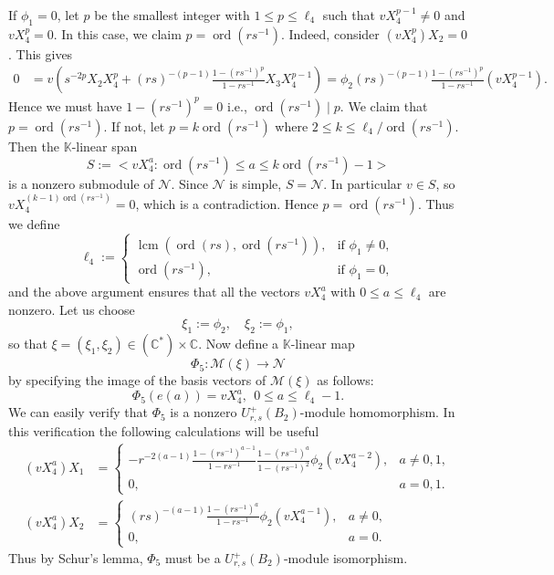 \documentclass[12 pt,reqno]{amsart}
\numberwithin{equation}{section}
\DeclareMathOperator{\ord}{ord}
\theoremstyle{definition}
\theoremstyle{definition}
\theoremstyle{remark}
\theoremstyle{remark}
\begin{document}
\noindent If $\phi_1 = 0$, let $p$ be the smallest integer with $1 \leq p \leq \ell_4$ such that $vX_4^{p-1}\neq 0$ and $vX_4^p=0$. In this case, we claim $p=\ord(rs^{-1})$. Indeed, consider $\left(vX_4^p\right)X_2=0$. This gives 
\begin{align*}
   0&=v \left(s^{-2p}X_2X_4^p+(rs)^{-(p-1)}\displaystyle\frac{1-(rs^{-1})^p}{1-rs^{-1}}X_3X_4^{p-1}\right)
   =\phi_2(rs)^{-(p-1)}\displaystyle\frac{1-(rs^{-1})^p}{1-rs^{-1}}\left(vX_4^{p-1}\right).
\end{align*}
Hence we must have $1-(rs^{-1})^p=0$ i.e., $\ord(rs^{-1})\mid p$. We claim that $p=\ord(rs^{-1})$. If not, let $p=k\ord(rs^{-1})$ where $2 \leq k \leq \displaystyle{\ell_4}/{\ord(rs^{-1})}$. Then the $\mathbb{K}$-linear span
\[S:=\big<vX_4^a: \ord(rs^{-1}) \leq a \leq k\ord(rs^{-1})-1\big>\]
 is a nonzero submodule of $\mathcal{N}$. Since $\mathcal{N}$ is simple, $S=\mathcal{N}$. In particular $v \in S$, so $vX_4^{(k-1)\ord(rs^{-1})}=0$, which is a contradiction. Hence $p=\ord(rs^{-1})$. Thus we define 
$$
  \ell_4 := 
    \begin{cases}
        \operatorname{lcm}(\ord(rs),\ord(rs^{-1})), & \text{if } \phi_1\neq 0 , \\[5pt]
        \ord(rs^{-1}), & \text{if } \phi_1=0,
    \end{cases}
$$
and the above argument ensures that all the vectors $vX_4^{a}$ with $0 \leq a \leq \ell_4$ are nonzero. Let us choose
\[\xi_1:=\phi_2,\quad \xi_2:=\phi_1,\] so that
$\xi=(\xi_1,\xi_2)\in {(\mathbb{C}^*)} \times \mathbb{C}$.  Now define a $\mathbb{K}$-linear map \[\Phi_5:\mathcal{M}(\xi)\rightarrow \mathcal{N}\] by specifying the image of the basis vectors of $\mathcal{M}(\xi)$ as follows:
\[\Phi_5\left(e(a)\right)=vX_{4}^a,\ \ 0\leq a\leq \ell_4-1.\] We can easily verify that $\Phi_5$ is a nonzero $U_{r,s}^+(B_2)$-module homomorphism. In this verification the following calculations will be useful
\begin{align*}
    \left(vX_4^a\right)X_1&=\begin{cases}
        \displaystyle -r^{-2(a-1)}\frac{1 - (rs^{-1})^{a-1}}{1 - rs^{-1}}\frac{1 - (rs^{-1})^a}{1 - (rs^{-1})^2}\phi_2\left(vX_4^{a-2}\right), & a \neq 0,1, \\[5pt] 
        0, & a = 0,1.
    \end{cases}\\
    \left(vX_4^a\right)X_2&=\begin{cases}
        \displaystyle (rs)^{-(a-1)}\frac{1 - (rs^{-1})^{a}}{1 - rs^{-1}}\phi_2\left(vX_4^{a-1}\right), & a \neq 0, \\[10pt]
        0, & a = 0.
    \end{cases}
\end{align*} Thus by Schur's lemma, $\Phi_5$ must be a $U_{r,s}^+(B_2)$-module isomorphism. \\
\end{document}
